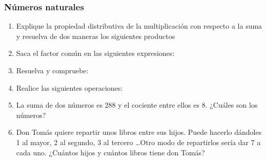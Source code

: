 \documentclass[letterpaper,11pt,twoside]{article}
\begin{document}
\subsubsection*{N\'{u}meros naturales}
\begin{enumerate}
\item Explique la propiedad distributiva de la multiplicaci\'{o}n con respecto a la suma y resuelva de dos maneras los siguientes productos
\begin{enumerate}
\end{enumerate}
\item Saca el factor común en las siguientes expresiones:
\begin{enumerate}
\end{enumerate}
\item Resuelva y compruebe:
\begin{enumerate}
\end{enumerate}
\item Realice las siguientes operaciones:
\begin{enumerate}
\end{enumerate}
\item La suma de dos números es 288 y el cociente entre ellos es 8. ¿Cuáles son los números?
\item Don Tomás quiere repartir unos libros entre sus hijos. Puede hacerlo dándoles 1 al mayor, 2 al segundo, 3 al tercero \ldots Otro modo de repartirlos sería dar 7 a cada uno. ¿Cuántos hijos y cuántos libros tiene don Tomás?

\end{enumerate}
\end{document}
